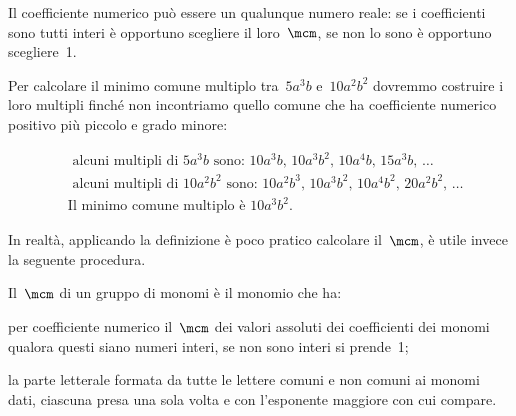 Il coefficiente numerico può essere un qualunque numero reale: se i
coefficienti sono tutti interi è opportuno scegliere il loro~$\mcm$,
se non lo sono è opportuno scegliere~1.

\begin{exrig}
 \begin{esempio}
Per calcolare il minimo comune multiplo tra~$5a^{3}b$ e~$10a^{2}b^{2}$ dovremmo costruire i loro multipli finché non
incontriamo quello comune che ha coefficiente numerico positivo più
piccolo e grado minore:



\begin{equation*}
\begin{split}
& \text{ alcuni multipli di }5a^{3}b\text{ sono: } 10a^{3}b\text{,~}10a^{3}b^{2}\text{,~}10a^{4}b\text{,~}15a^{3}b\text{,~}\ldots \\
& \text{ alcuni multipli di }10a^{2}b^{2}\text{ sono: } 10a^{2}b^{3}\text{,~}10a^{3}b^{2}\text{,~}10a^{4}b^{2}\text{,~}20a^{2}b^{2}\text{,~}\ldots \\
& \text{Il minimo comune multiplo è }10a^{3}b^{2}.
\end{split}
\end{equation*}
 \end{esempio}
\end{exrig}

In realtà, applicando la definizione è poco pratico calcolare il~$\mcm$, è utile invece la seguente procedura.

\begin{procedura}
Il~$\mcm$ di un gruppo di monomi è il monomio che ha:

\begin{enumeratea}
 \item per coefficiente numerico il~$\mcm$ dei valori assoluti dei
coefficienti dei monomi qualora
questi siano numeri interi, se non sono interi si prende~1;
 \item la parte letterale formata da tutte le lettere comuni e non comuni
ai monomi dati, ciascuna
presa una sola volta e con l'esponente maggiore con
cui compare.
\end{enumeratea}
\end{procedura}

